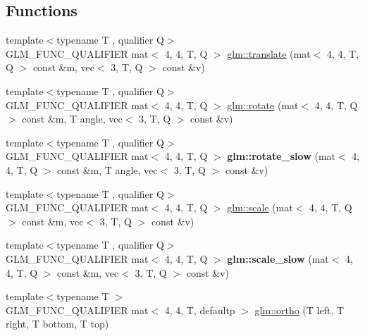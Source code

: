 \subsection*{Functions}
\begin{DoxyCompactItemize}
\item 
{\footnotesize template$<$typename T , qualifier Q$>$ }\\G\+L\+M\+\_\+\+F\+U\+N\+C\+\_\+\+Q\+U\+A\+L\+I\+F\+I\+ER mat$<$ 4, 4, T, Q $>$ \hyperlink{group__gtc__matrix__transform_ga1a4ecc4ad82652b8fb14dcb087879284}{glm\+::translate} (mat$<$ 4, 4, T, Q $>$ const \&m, vec$<$ 3, T, Q $>$ const \&v)
\item 
{\footnotesize template$<$typename T , qualifier Q$>$ }\\G\+L\+M\+\_\+\+F\+U\+N\+C\+\_\+\+Q\+U\+A\+L\+I\+F\+I\+ER mat$<$ 4, 4, T, Q $>$ \hyperlink{group__gtc__matrix__transform_gaee9e865eaa9776370996da2940873fd4}{glm\+::rotate} (mat$<$ 4, 4, T, Q $>$ const \&m, T angle, vec$<$ 3, T, Q $>$ const \&v)
\item 
\mbox{\label{matrix__transform_8inl_ae6c0c49198a58536fac6ab580073b157}} 
{\footnotesize template$<$typename T , qualifier Q$>$ }\\G\+L\+M\+\_\+\+F\+U\+N\+C\+\_\+\+Q\+U\+A\+L\+I\+F\+I\+ER mat$<$ 4, 4, T, Q $>$ {\bfseries glm\+::rotate\+\_\+slow} (mat$<$ 4, 4, T, Q $>$ const \&m, T angle, vec$<$ 3, T, Q $>$ const \&v)
\item 
{\footnotesize template$<$typename T , qualifier Q$>$ }\\G\+L\+M\+\_\+\+F\+U\+N\+C\+\_\+\+Q\+U\+A\+L\+I\+F\+I\+ER mat$<$ 4, 4, T, Q $>$ \hyperlink{group__gtc__matrix__transform_ga05051adbee603fb3c5095d8cf5cc229b}{glm\+::scale} (mat$<$ 4, 4, T, Q $>$ const \&m, vec$<$ 3, T, Q $>$ const \&v)
\item 
\mbox{\label{matrix__transform_8inl_a48c8a5c9d619e11a0e2908d7099f361f}} 
{\footnotesize template$<$typename T , qualifier Q$>$ }\\G\+L\+M\+\_\+\+F\+U\+N\+C\+\_\+\+Q\+U\+A\+L\+I\+F\+I\+ER mat$<$ 4, 4, T, Q $>$ {\bfseries glm\+::scale\+\_\+slow} (mat$<$ 4, 4, T, Q $>$ const \&m, vec$<$ 3, T, Q $>$ const \&v)
\item 
{\footnotesize template$<$typename T $>$ }\\G\+L\+M\+\_\+\+F\+U\+N\+C\+\_\+\+Q\+U\+A\+L\+I\+F\+I\+ER mat$<$ 4, 4, T, defaultp $>$ \hyperlink{group__gtc__matrix__transform_gae5b6b40ed882cd56cd7cb97701909c06}{glm\+::ortho} (T left, T right, T bottom, T top)

\end{DoxyCompactItemize}
